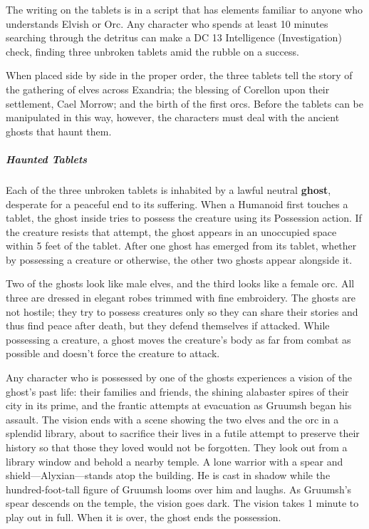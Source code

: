 \documentclass[10pt,a4paper,twoside,fancy,bg=print,twocolumn,openany,nodeprecatedcode]{dndbook}
\begin{document}
The writing on the tablets is in a script that has elements familiar to anyone who understands Elvish or Orc. Any character who spends at least 10 minutes searching through the detritus can make a DC 13 Intelligence (Investigation) check, finding three unbroken tablets amid the rubble on a success.

When placed side by side in the proper order, the three tablets tell the story of the gathering of elves across Exandria; the blessing of Corellon upon their settlement, Cael Morrow; and the birth of the first orcs. Before the tablets can be manipulated in this way, however, the characters must deal with the ancient ghosts that haunt them.

\subparagraph{Haunted Tablets}
Each of the three unbroken tablets is inhabited by a lawful neutral \textbf{ghost}, desperate for a peaceful end to its suffering. When a Humanoid first touches a tablet, the ghost inside tries to possess the creature using its Possession action. If the creature resists that attempt, the ghost appears in an unoccupied space within 5 feet of the tablet. After one ghost has emerged from its tablet, whether by possessing a creature or otherwise, the other two ghosts appear alongside it.

Two of the ghosts look like male elves, and the third looks like a female orc. All three are dressed in elegant robes trimmed with fine embroidery. The ghosts are not hostile; they try to possess creatures only so they can share their stories and thus find peace after death, but they defend themselves if attacked. While possessing a creature, a ghost moves the creature's body as far from combat as possible and doesn't force the creature to attack.

Any character who is possessed by one of the ghosts experiences a vision of the ghost's past life: their families and friends, the shining alabaster spires of their city in its prime, and the frantic attempts at evacuation as Gruumsh began his assault. The vision ends with a scene showing the two elves and the orc in a splendid library, about to sacrifice their lives in a futile attempt to preserve their history so that those they loved would not be forgotten. They look out from a library window and behold a nearby temple. A lone warrior with a spear and shield—Alyxian—stands atop the building. He is cast in shadow while the hundred-foot-tall figure of Gruumsh looms over him and laughs. As Gruumsh's spear descends on the temple, the vision goes dark. The vision takes 1 minute to play out in full. When it is over, the ghost ends the possession.
\end{document}

